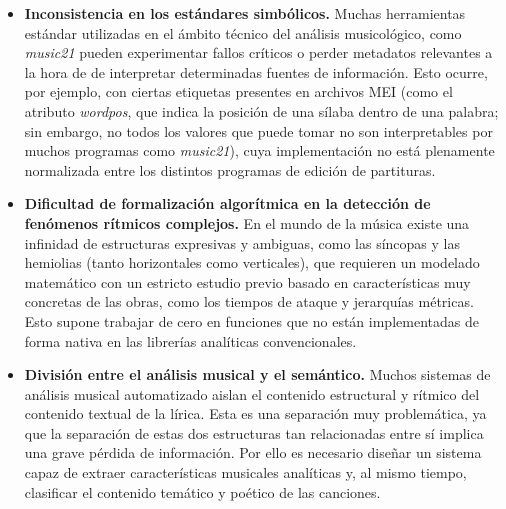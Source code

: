 \begin{itemize}
Además, la heterogeneidad del corpus no se limita al formato de los ficheros, sino que también afecta a los criterios de catalogación y organización de los repositorios. En estos casos, pueden encontrarse con frecuencia colecciones donde ciertos metadatos fundamentales, como el título de la obra, el autor o la procedencia geográfica, se almacenan dentro de la propia estructura del archivo, mientras que en otros casos dicha información únicamente está disponible en el nombre del fichero o en la organización jerárquica de los directorios. La ausencia de estándares homogéneos de descripción documental dificulta la identificación automática de las obras y requiere mecanismos adicionales de inferencia y validación de metadatos.
\item \textbf{Inconsistencia en los estándares simbólicos.} Muchas herramientas estándar utilizadas en el ámbito técnico del análisis musicológico, como \textit{music21} \citep{cuthbert2010music21} pueden experimentar fallos críticos o perder metadatos relevantes a la hora de de interpretar determinadas fuentes de información. Esto ocurre, por ejemplo, con ciertas etiquetas presentes en archivos MEI (como el atributo \textit{wordpos}, que indica la posición de una sílaba dentro de una palabra; sin embargo, no todos los valores que puede tomar no son interpretables por muchos programas como \textit{music21}), cuya implementación no está plenamente normalizada entre los distintos programas de edición de partituras.
\item \textbf{Dificultad de formalización algorítmica en la detección de fenómenos rítmicos complejos.} En el mundo de la música existe una infinidad de estructuras expresivas y ambiguas, como las síncopas y las hemiolias (tanto horizontales como verticales), que requieren un modelado matemático con un estricto estudio previo basado en características muy concretas de las obras, como los tiempos de ataque y jerarquías métricas. Esto supone trabajar de cero en funciones que no están implementadas de forma nativa en las librerías analíticas convencionales.
\item \textbf{División entre el análisis musical y el semántico.} Muchos sistemas de análisis musical automatizado aislan el contenido estructural y rítmico del contenido textual de la lírica. Esta es una separación muy problemática, ya que la separación de estas dos estructuras tan relacionadas entre sí implica una grave pérdida de información. Por ello es necesario diseñar un sistema capaz de extraer características musicales analíticas y, al mismo tiempo, clasificar el contenido temático y poético de las canciones.

\end{itemize}
